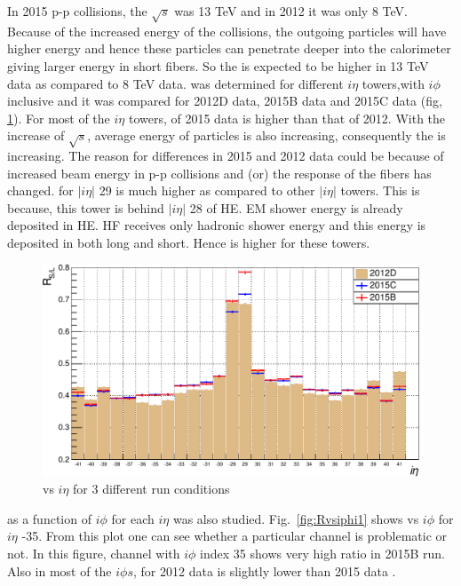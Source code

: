 In 2015 p-p collisions, the $\sqrt{s}$ was 13 TeV and in 2012 it was only 8 TeV. 
Because of the increased energy of the collisions, the outgoing particles will have 
higher energy and hence these particles can penetrate deeper into the calorimeter giving
larger energy in short fibers. So the \ratiosl is expected to be higher in 13 TeV data as
compared to 8 TeV data. \ratiosl was determined for different $i \eta$ towers,with $i \phi$ 
inclusive and it was compared for 2012D data, 2015B data and 2015C data (fig, \ref{RvsIeta}).
For most of the $i \eta$ towers, \ratiosl of 2015 data is higher than that of 2012. With the 
increase of $\sqrt{s}$, average energy of particles is also increasing, consequently the 
\ratiosl is increasing. The reason for differences in 2015 and 2012 data could be because
of increased beam energy in p-p collisions and (or) the response of the fibers has changed.
\ratiosl for $|i\eta|$ 29 is much higher as compared to other $|i\eta|$ towers. This is because, this tower is behind $|i\eta|$ 28 of HE. EM shower energy is already deposited in HE. HF receives only hadronic shower energy and this energy is deposited in both long and short. Hence \ratiosl is higher for these towers.
\begin{figure}[h!]
\centering
\includegraphics[width=0.7\linewidth]{../Figures/Chap2/ImageFiles_HF/2012vs2015/RvsIeta.pdf}
\caption{\ratiosl vs $i \eta$ for 3 different run conditions}
\label{RvsIeta}
\end{figure}
\ratiosl as a function of $i\phi$ for each $i \eta$ was also studied. Fig.~\ref{fig:Rvsiphi1} shows \ratiosl vs $i \phi$ for $i \eta$ -35. From this plot one can see whether a particular channel is problematic or not. In this figure, channel with $i \phi$ index 35 shows very high ratio in 2015B run. Also in most of the $i \phi s$, \ratiosl for 2012 data is slightly lower than 2015 data \ratiosl. %
